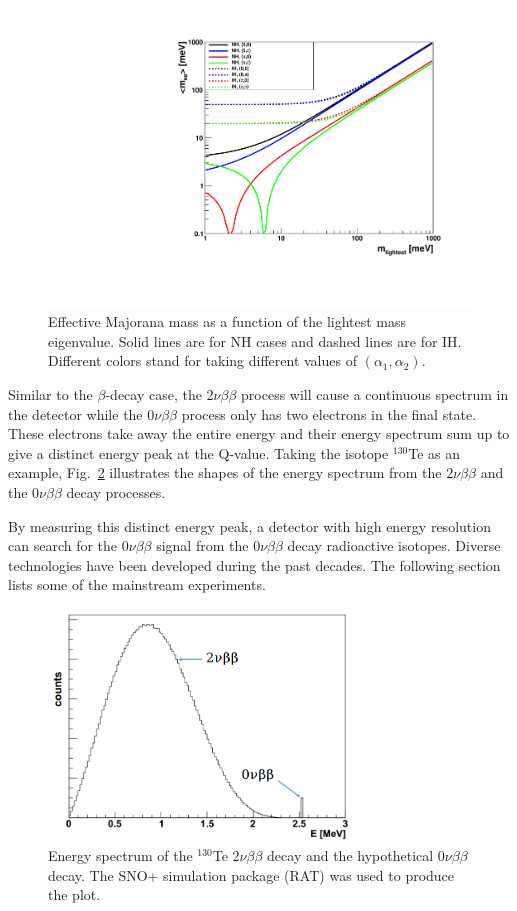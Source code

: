 \begin{figure}[htbp]\label{effectiveMajorana}
	\centering	
	\includegraphics[width=12cm]{effectiveMassPlots.pdf}
	\caption{Effective Majorana mass as a function of the lightest mass eigenvalue. Solid lines are for NH cases and dashed lines are for IH. Different colors stand for taking different values of $(\alpha_1,\alpha_2)$.}
	\label{effectiveMass}
\end{figure}

Similar to the $\beta$-decay case, the $2\nu\beta\beta$ process will cause a continuous spectrum in the detector while the $0\nu\beta\beta$ process only has two electrons in the final state. These electrons take away the entire energy and their energy spectrum sum up to give a distinct energy peak at the Q-value. 
Taking the isotope $^{130}$Te as an example, Fig.~\ref{te130energy} illustrates the shapes of the energy spectrum from the $2\nu\beta\beta$ and the $0\nu\beta\beta$ decay processes.

By measuring this distinct energy peak, a detector with high energy resolution can search for the $0\nu\beta\beta$ signal from the $0\nu\beta\beta$ decay radioactive isotopes. Diverse technologies have been developed during the past decades. The following section lists some of the mainstream experiments.

\begin{figure}[htbp]
	\centering	
	\includegraphics[width=8cm]{Te130_energy0vbb.png}
	\caption{Energy spectrum of the $^{130}$Te $2\nu\beta\beta$ decay and the hypothetical $0\nu\beta\beta$ decay. The SNO+ simulation package (RAT) was used to produce the plot.}
	\label{te130energy}
\end{figure}

